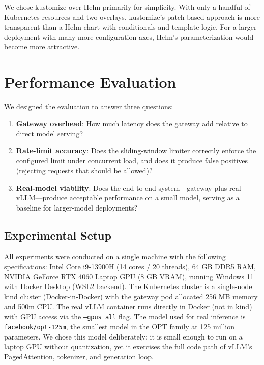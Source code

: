 \documentclass[10pt,journal]{IEEEtran}
\begin{document}
We chose kustomize over Helm primarily for simplicity. With only a handful of Kubernetes resources and two overlays, kustomize's patch-based approach is more transparent than a Helm chart with conditionals and template logic. For a larger deployment with many more configuration axes, Helm's parameterization would become more attractive.

\section{Performance Evaluation}\label{sec:evaluation}

We designed the evaluation to answer three questions:

\begin{enumerate}
  \item \textbf{Gateway overhead}: How much latency does the gateway add relative to direct model serving?
  \item \textbf{Rate-limit accuracy}: Does the sliding-window limiter correctly enforce the configured limit under concurrent load, and does it produce false positives (rejecting requests that should be allowed)?
  \item \textbf{Real-model viability}: Does the end-to-end system---gateway plus real vLLM---produce acceptable performance on a small model, serving as a baseline for larger-model deployments?
\end{enumerate}

\subsection{Experimental Setup}

All experiments were conducted on a single machine with the following specifications: Intel Core i9-13900H (14 cores / 20 threads), 64 GB DDR5 RAM, NVIDIA GeForce RTX 4060 Laptop GPU (8 GB VRAM), running Windows 11 with Docker Desktop (WSL2 backend). The Kubernetes cluster is a single-node kind cluster (Docker-in-Docker) with the gateway pod allocated 256 MB memory and 500m CPU. The real vLLM container runs directly in Docker (not in kind) with GPU access via the \texttt{--gpus all} flag. The model used for real inference is \texttt{facebook/opt-125m}, the smallest model in the OPT family at 125 million parameters. We chose this model deliberately: it is small enough to run on a laptop GPU without quantization, yet it exercises the full code path of vLLM's PagedAttention, tokenizer, and generation loop.
\end{document}

